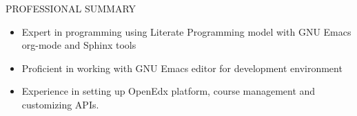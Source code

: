 \documentclass{resume} %
\begin{document}
\begin{rSection}{PROFESSIONAL SUMMARY}
\begin{itemize}
  \item Expert in programming using Literate Programming model with
    GNU Emacs org-mode and Sphinx tools


  \item Proficient in working with GNU Emacs editor for development
    environment

    
  \item Experience in setting up OpenEdx platform, course
    management and customizing APIs.
    

  \end{itemize}

\end{rSection}

\end{document}
